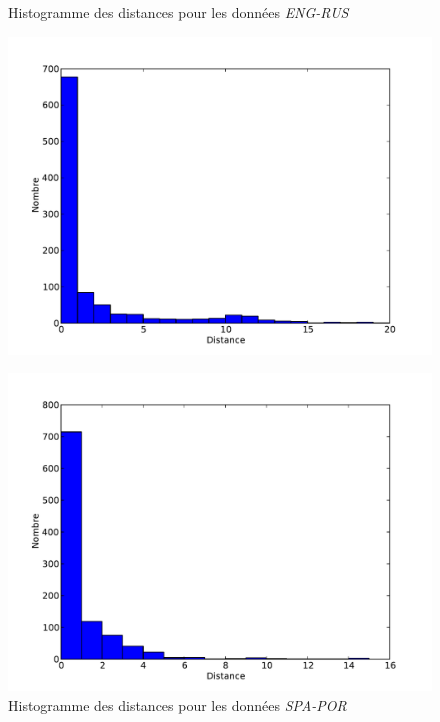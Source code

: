 \documentclass{article}
\begin{document}
\begin{figure}[H]
\begin{center}
    \caption{Histogramme des distances pour les données \emph{ENG-RUS}}
    \label{hist_1}
    \includegraphics[scale=0.45]{moses_histogram_rus.pdf}
    
    \caption{Histogramme des distances pour les données \emph{SPA-POR}}
    \label{hist_2}
    \includegraphics[scale=0.45]{moses_histogram_por.pdf}
\end{center}
\end{figure}
\end{document}
